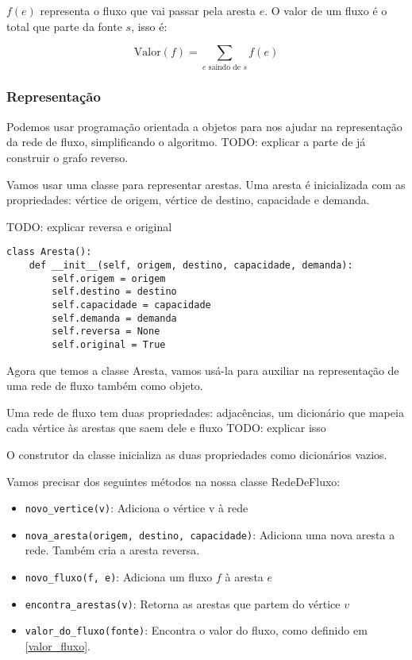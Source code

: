 \documentclass[11pt]{article}
\begin{document}
$f(e)$ representa o fluxo que vai passar pela aresta $e$. O valor de
um fluxo é o total que parte da fonte $s$, isso é:

$$\label{valor_fluxo} \mathrm{Valor}(f) = \sum_{e \text{ saindo de } s} f(e) $$

\subsubsection{Representação}
\label{sec-3-1-2}

Podemos usar programação orientada a objetos para nos ajudar na
representação da rede de fluxo, simplificando o algoritmo.
TODO: explicar a parte de já construir o grafo reverso.

Vamos usar uma classe para representar arestas. Uma aresta é
inicializada com as propriedades: vértice de origem, vértice de
destino, capacidade e demanda.

TODO: explicar reversa e original
\begin{verbatim}
class Aresta():
    def __init__(self, origem, destino, capacidade, demanda):
        self.origem = origem
        self.destino = destino
        self.capacidade = capacidade
        self.demanda = demanda
        self.reversa = None
        self.original = True
\end{verbatim}

Agora que temos a classe Aresta, vamos usá-la para auxiliar na
representação de uma rede de fluxo também como objeto.

Uma rede de fluxo tem duas propriedades: adjacências, um dicionário
que mapeia cada vértice às arestas que saem dele e fluxo TODO: explicar isso

O construtor da classe inicializa as duas propriedades como dicionários vazios.

Vamos precisar dos seguintes métodos na nossa classe RedeDeFluxo:

\begin{itemize}
\item \verb~novo_vertice(v)~: Adiciona o vértice v à rede
\item \verb~nova_aresta(origem, destino, capacidade)~: Adiciona uma nova aresta a
rede. Também cria a aresta reversa.
\item \verb~novo_fluxo(f, e)~: Adiciona um fluxo $f$ à aresta $e$
\item \verb~encontra_arestas(v)~: Retorna as arestas que partem do vértice $v$
\item \verb~valor_do_fluxo(fonte)~: Encontra o valor do fluxo, como definido em \eqref{valor_fluxo}.
\end{itemize}
\end{document}
